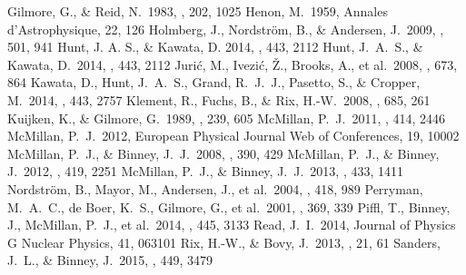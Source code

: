 \documentclass[iop,revtex4]{emulateapj}
\begin{document}
\begin{thebibliography}{}
 Gilmore, G., \& Reid, N.\ 1983, \mnras, 202, 1025 
 Henon, M.\ 1959, Annales d'Astrophysique, 22, 126 
 Holmberg, J., Nordstr{\"o}m, B., \& Andersen, J.\ 2009, \aap, 501, 941 
 Hunt, J. A. S., \& Kawata, D. 2014, \mnras, 443, 2112
 Hunt, J.~A.~S., \& Kawata, D.\ 2014, \mnras, 443, 2112 
 Juri{\'c}, M., Ivezi{\'c}, {\v Z}., Brooks, A., et al.\ 2008, \apj, 673, 864 
 Kawata, D., Hunt, J.~A.~S., Grand, R.~J.~J., Pasetto, S., \& Cropper, M.\ 2014, \mnras, 443, 2757 
 Klement, R., Fuchs, B., \& Rix, H.-W.\ 2008, \apj, 685, 261 
 Kuijken, K., \& Gilmore, G.\ 1989, \mnras, 239, 605 
 McMillan, P.~J.\ 2011, \mnras, 414, 2446 %
 McMillan, P.~J.\ 2012, European Physical Journal Web of Conferences, 19, 10002 
 McMillan, P.~J., \& Binney, J.~J.\ 2008, \mnras, 390, 429 
 McMillan, P.~J., \& Binney, J.\ 2012, \mnras, 419, 2251 
 McMillan, P.~J., \& Binney, J.~J.\ 2013, \mnras, 433, 1411 
 Nordstr{\"o}m, B., Mayor, M., Andersen, J., et al.\ 2004, \aap, 418, 989 
 Perryman, M.~A.~C., de Boer, K.~S., Gilmore, G., et al.\ 2001, \aap, 369, 339 
 Piffl, T., Binney, J., McMillan, P.~J., et al.\ 2014, \mnras, 445, 3133
 Read, J.~I.\ 2014, Journal of Physics G Nuclear Physics, 41, 063101 
 Rix, H.-W., \& Bovy, J.\ 2013, \aapr, 21, 61 %
 Sanders, J.~L., \& Binney, J.\ 2015, \mnras, 449, 3479

\end{thebibliography}
\end{document}
